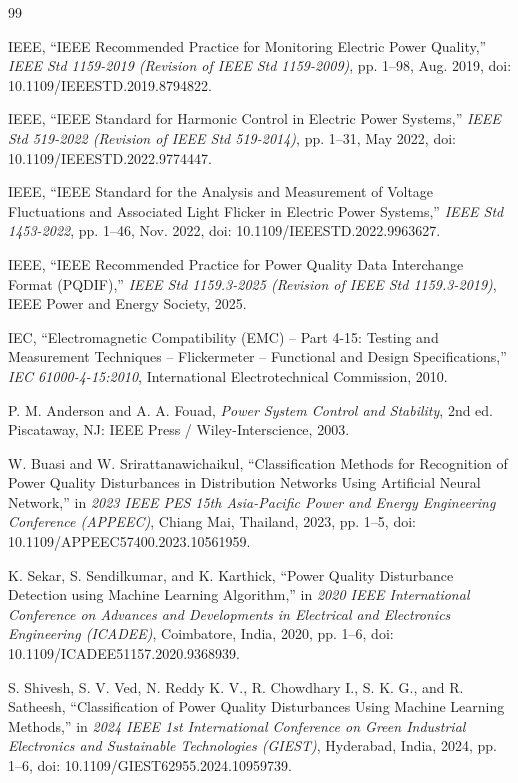 \documentclass[12pt,a4paper]{report}
\begin{document}
\begin{thebibliography}{99}

IEEE, ``IEEE Recommended Practice for Monitoring Electric Power Quality,'' \textit{IEEE Std 1159-2019 (Revision of IEEE Std 1159-2009)}, pp. 1--98, Aug. 2019, doi: 10.1109/IEEESTD.2019.8794822.

IEEE, ``IEEE Standard for Harmonic Control in Electric Power Systems,'' \textit{IEEE Std 519-2022 (Revision of IEEE Std 519-2014)}, pp. 1--31, May 2022, doi: 10.1109/IEEESTD.2022.9774447.

IEEE, ``IEEE Standard for the Analysis and Measurement of Voltage Fluctuations and Associated Light Flicker in Electric Power Systems,'' \textit{IEEE Std 1453-2022}, pp. 1--46, Nov. 2022, doi: 10.1109/IEEESTD.2022.9963627.

IEEE, ``IEEE Recommended Practice for Power Quality Data Interchange Format (PQDIF),'' \textit{IEEE Std 1159.3-2025 (Revision of IEEE Std 1159.3-2019)}, IEEE Power and Energy Society, 2025.

IEC, ``Electromagnetic Compatibility (EMC) -- Part 4-15: Testing and Measurement Techniques -- Flickermeter -- Functional and Design Specifications,'' \textit{IEC 61000-4-15:2010}, International Electrotechnical Commission, 2010.

P. M. Anderson and A. A. Fouad, \textit{Power System Control and Stability}, 2nd ed. Piscataway, NJ: IEEE Press / Wiley-Interscience, 2003.

W. Buasi and W. Srirattanawichaikul, ``Classification Methods for Recognition of Power Quality Disturbances in Distribution Networks Using Artificial Neural Network,'' in \textit{2023 IEEE PES 15th Asia-Pacific Power and Energy Engineering Conference (APPEEC)}, Chiang Mai, Thailand, 2023, pp. 1--5, doi: 10.1109/APPEEC57400.2023.10561959.

K. Sekar, S. Sendilkumar, and K. Karthick, ``Power Quality Disturbance Detection using Machine Learning Algorithm,'' in \textit{2020 IEEE International Conference on Advances and Developments in Electrical and Electronics Engineering (ICADEE)}, Coimbatore, India, 2020, pp. 1--6, doi: 10.1109/ICADEE51157.2020.9368939.

S. Shivesh, S. V. Ved, N. Reddy K. V., R. Chowdhary I., S. K. G., and R. Satheesh, ``Classification of Power Quality Disturbances Using Machine Learning Methods,'' in \textit{2024 IEEE 1st International Conference on Green Industrial Electronics and Sustainable Technologies (GIEST)}, Hyderabad, India, 2024, pp. 1--6, doi: 10.1109/GIEST62955.2024.10959739.


\end{thebibliography}
\end{document}
